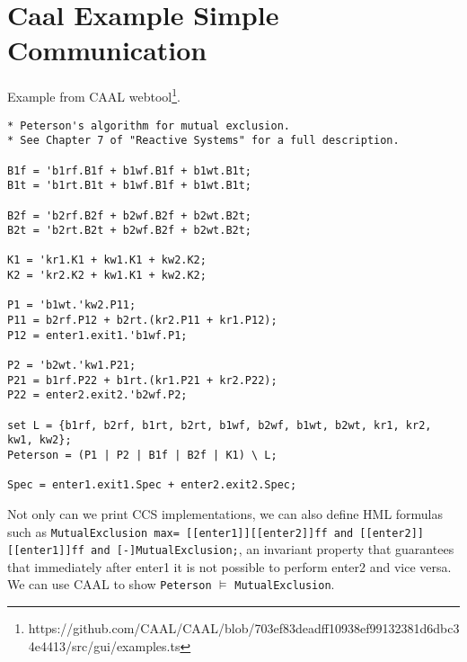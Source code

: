 \documentclass{article}
\begin{document}
\section{Caal Example Simple Communication}
Example from CAAL webtool\footnote{https://github.com/CAAL/CAAL/blob/703ef83deadff10938ef99132381d6dbc34e4413/src/gui/examples.ts}.
\begin{lstlisting}
* Peterson's algorithm for mutual exclusion.
* See Chapter 7 of "Reactive Systems" for a full description.

B1f = 'b1rf.B1f + b1wf.B1f + b1wt.B1t;
B1t = 'b1rt.B1t + b1wf.B1f + b1wt.B1t;

B2f = 'b2rf.B2f + b2wf.B2f + b2wt.B2t;
B2t = 'b2rt.B2t + b2wf.B2f + b2wt.B2t;

K1 = 'kr1.K1 + kw1.K1 + kw2.K2;
K2 = 'kr2.K2 + kw1.K1 + kw2.K2;

P1 = 'b1wt.'kw2.P11;
P11 = b2rf.P12 + b2rt.(kr2.P11 + kr1.P12);
P12 = enter1.exit1.'b1wf.P1;

P2 = 'b2wt.'kw1.P21;
P21 = b1rf.P22 + b1rt.(kr1.P21 + kr2.P22);
P22 = enter2.exit2.'b2wf.P2;

set L = {b1rf, b2rf, b1rt, b2rt, b1wf, b2wf, b1wt, b2wt, kr1, kr2, kw1, kw2};
Peterson = (P1 | P2 | B1f | B2f | K1) \ L;

Spec = enter1.exit1.Spec + enter2.exit2.Spec;
\end{lstlisting}

\noindent{}Not only can we print CCS implementations, we can also define HML formulas such as
\lstinline{MutualExclusion max= [[enter1]][[enter2]]ff and [[enter2]][[enter1]]ff and [-]MutualExclusion;}, an invariant property that guarantees that immediately after enter1 it is not possible to perform enter2 and vice versa. We can use CAAL to show \lstinline{Peterson} $\models$ \lstinline{MutualExclusion}.
\end{document}
